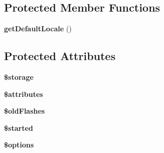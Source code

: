 \subsection*{\-Protected \-Member \-Functions}
\begin{DoxyCompactItemize}
\item 
\hypertarget{class_symfony_1_1_component_1_1_http_foundation_1_1_session_a0d8ad1a87eab4f3577a5d7cb8ce9df38}{
{\bfseries get\-Default\-Locale} ()}
\label{class_symfony_1_1_component_1_1_http_foundation_1_1_session_a0d8ad1a87eab4f3577a5d7cb8ce9df38}

\end{DoxyCompactItemize}
\subsection*{\-Protected \-Attributes}
\begin{DoxyCompactItemize}
\item 
\hypertarget{class_symfony_1_1_component_1_1_http_foundation_1_1_session_a23658d9b796eebdea4cee5c9f0046894}{
{\bfseries \$storage}}
\label{class_symfony_1_1_component_1_1_http_foundation_1_1_session_a23658d9b796eebdea4cee5c9f0046894}

\item 
\hypertarget{class_symfony_1_1_component_1_1_http_foundation_1_1_session_adc851f7a62250e75df0490c0280aef4c}{
{\bfseries \$attributes}}
\label{class_symfony_1_1_component_1_1_http_foundation_1_1_session_adc851f7a62250e75df0490c0280aef4c}

\item 
\hypertarget{class_symfony_1_1_component_1_1_http_foundation_1_1_session_aabaac3a12724604251c92ea4db5780c6}{
{\bfseries \$old\-Flashes}}
\label{class_symfony_1_1_component_1_1_http_foundation_1_1_session_aabaac3a12724604251c92ea4db5780c6}

\item 
\hypertarget{class_symfony_1_1_component_1_1_http_foundation_1_1_session_a026c0305d62db3dbb5ad555bc077f018}{
{\bfseries \$started}}
\label{class_symfony_1_1_component_1_1_http_foundation_1_1_session_a026c0305d62db3dbb5ad555bc077f018}

\item 
\hypertarget{class_symfony_1_1_component_1_1_http_foundation_1_1_session_a011800c63ece4cbbfa77136a20607023}{
{\bfseries \$options}}
\label{class_symfony_1_1_component_1_1_http_foundation_1_1_session_a011800c63ece4cbbfa77136a20607023}

\end{DoxyCompactItemize}


